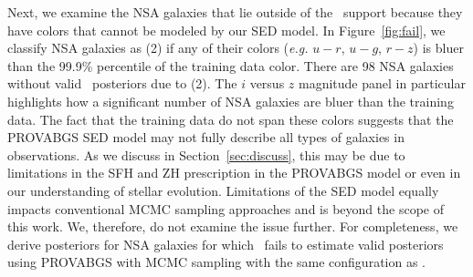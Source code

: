 Next, we examine the NSA galaxies that lie outside of the \sedflow~support
because they have colors that cannot be modeled by our SED model. 
In Figure~\ref{fig:fail}, we classify NSA galaxies as (2) if any of their
colors (\emph{e.g.} $u-r$, $u-g$, $r-z$) is bluer than the 99.9\% percentile of
the training data color. 
There are 98 NSA galaxies without valid \sedflow~posteriors due to (2).
The $i$ versus $z$ magnitude panel in particular highlights how a significant
number of NSA galaxies are bluer than the training data. 
The fact that the training data do not span these colors suggests that the
PROVABGS SED model may not fully describe all types of galaxies in observations. 
As we discuss in Section~\ref{sec:discuss}, this may be due to limitations in
the SFH and ZH prescription in the PROVABGS model or even in our understanding
of stellar evolution. 
Limitations of the SED model equally impacts conventional MCMC sampling
approaches and is beyond the scope of this work. 
We, therefore, do not examine the issue further. 
For completeness, we derive posteriors for NSA galaxies for which \sedflow~fails
to estimate valid posteriors using PROVABGS with MCMC sampling with the same
configuration as \cite{hahn2022}. 

